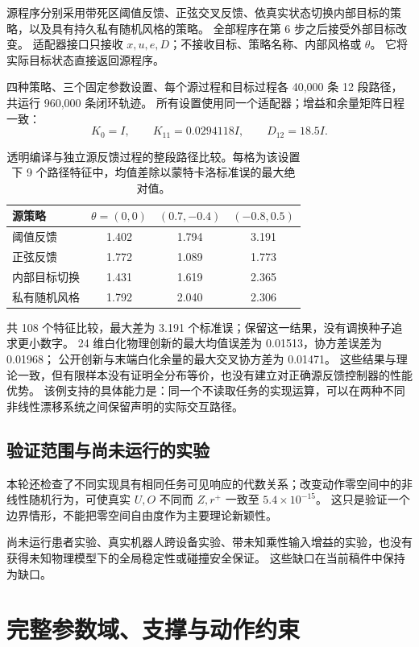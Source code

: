 \documentclass[UTF8,fontset=fandol,11pt,a4paper]{ctexart}
\theoremstyle{definition}
\theoremstyle{remark}
\numberwithin{equation}{section}
\begin{document}
源程序分别采用带死区阈值反馈、正弦交叉反馈、依真实状态切换内部目标的策略，以及具有持久私有随机风格的策略。
全部程序在第 6 步之后接受外部目标改变。
适配器接口只接收 $x,u,e,D$；不接收目标、策略名称、内部风格或 $\theta$。
它将实际目标状态直接返回源程序。

四种策略、三个固定参数设置、每个源过程和目标过程各 40,000 条 12 段路径，共运行 960,000 条闭环轨迹。
所有设置使用同一个适配器；增益和余量矩阵日程一致：
\begin{equation}
 K_0=I,\qquad K_{11}=0.0294118I,\qquad D_{12}=18.5I.
\end{equation}

\begin{table}[htbp]
\centering\small
\caption{透明编译与独立源反馈过程的整段路径比较。每格为该设置下 9 个路径特征中，均值差除以蒙特卡洛标准误的最大绝对值。}
\begin{tabular}{@{}lccc@{}}
\toprule
源策略 & $\theta=(0,0)$ & $(0.7,-0.4)$ & $(-0.8,0.5)$ \\
\midrule
阈值反馈 & 1.402 & 1.794 & 3.191 \\
正弦反馈 & 1.772 & 1.089 & 1.773 \\
内部目标切换 & 1.431 & 1.619 & 2.365 \\
私有随机风格 & 1.792 & 2.040 & 2.306 \\
\bottomrule
\end{tabular}
\end{table}

共 108 个特征比较，最大差为 3.191 个标准误；保留这一结果，没有调换种子追求更小数字。
24 维白化物理创新的最大均值误差为 0.01513，协方差误差为 0.01968；
公开创新与末端白化余量的最大交叉协方差为 0.01471。
这些结果与理论一致，但有限样本没有证明全分布等价，也没有建立对正确源反馈控制器的性能优势。
该例支持的具体能力是：同一个不读取任务的实现运算，可以在两种不同非线性漂移系统之间保留声明的实际交互路径。

\subsection{验证范围与尚未运行的实验}
本轮还检查了不同实现具有相同任务可见响应的代数关系；改变动作零空间中的非线性随机行为，可使真实 $U,O$ 不同而 $Z,r^+$ 一致至 $5.4\times10^{-15}$。
这只是验证一个边界情形，不能把零空间自由度作为主要理论新颖性。

尚未运行患者实验、真实机器人跨设备实验、带未知乘性输入增益的实验，也没有获得未知物理模型下的全局稳定性或碰撞安全保证。
这些缺口在当前稿件中保持为缺口。

\section{完整参数域、支撑与动作约束}
\end{document}
